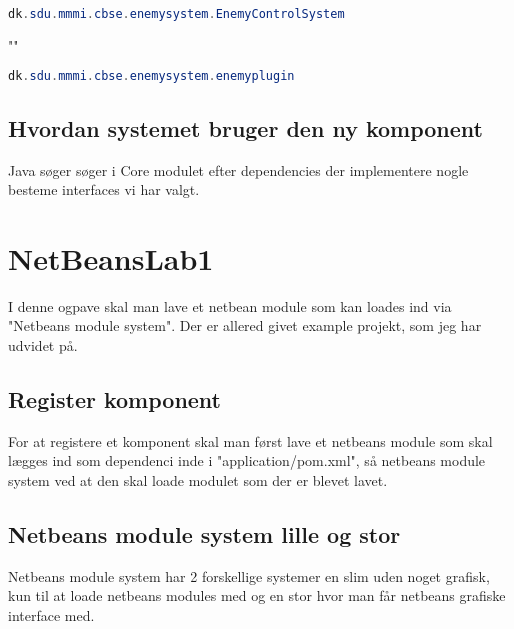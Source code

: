 \begin{lstlisting}[caption={dk.sdu.mmmi.cbse.common.services.IEntityProcessingService}, label={lst:App}, language=java]
dk.sdu.mmmi.cbse.enemysystem.EnemyControlSystem
\end{lstlisting}
""
\begin{lstlisting}[caption={dk.sdu.mmmi.cbse.common.services.igamepluginservice}, label={lst:app}, language=java]
dk.sdu.mmmi.cbse.enemysystem.enemyplugin
\end{lstlisting}


\subsection{Hvordan systemet bruger den ny komponent}
Java søger søger i Core modulet efter dependencies der implementere nogle
besteme interfaces vi har valgt.




\newpage
\section{NetBeansLab1}
I denne ogpave skal man lave et netbean module som kan loades ind via
"Netbeans module system". Der er allered givet example projekt, som jeg har
udvidet på.

\subsection{Register komponent}
For at registere et komponent skal man først lave et netbeans module som skal
lægges ind som dependenci inde i "application/pom.xml", så netbeans module
system ved at den skal loade modulet som der er blevet lavet.


\subsection{Netbeans module system lille og stor}
Netbeans module system har 2 forskellige systemer en slim uden noget grafisk,
kun til at loade netbeans modules med og en stor hvor man får netbeans grafiske
interface med.



